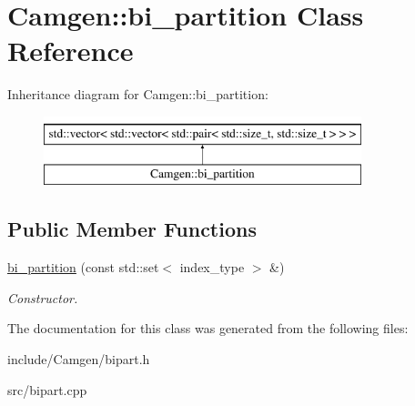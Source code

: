\hypertarget{a00020}{}\section{Camgen\+:\+:bi\+\_\+partition Class Reference}
\label{a00020}
Inheritance diagram for Camgen\+:\+:bi\+\_\+partition\+:\begin{figure}[H]
\begin{center}
\leavevmode
\includegraphics[height=2.000000cm]{a00020}
\end{center}
\end{figure}
\subsection*{Public Member Functions}
\begin{DoxyCompactItemize}
\item 
\hypertarget{a00020_afc0561a02fd718108cb713a6a42e70b3}{}\hyperlink{a00020_afc0561a02fd718108cb713a6a42e70b3}{bi\+\_\+partition} (const std\+::set$<$ index\+\_\+type $>$ \&)\label{a00020_afc0561a02fd718108cb713a6a42e70b3}

\begin{DoxyCompactList}\small\item\em Constructor. \end{DoxyCompactList}\end{DoxyCompactItemize}


The documentation for this class was generated from the following files\+:\begin{DoxyCompactItemize}
\item 
include/\+Camgen/bipart.\+h\item 
src/bipart.\+cpp\end{DoxyCompactItemize}

